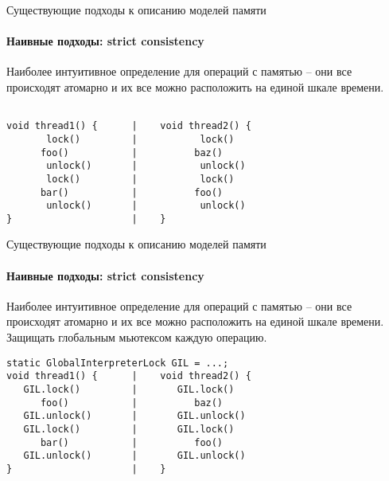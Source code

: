\begin{frame}{Существующие подходы к описанию моделей памяти}
\framesubtitle{Наивные подходы: strict consistency}

Наиболее интуитивное определение для операций с памятью -- они все происходят атомарно и их все можно расположить на единой шкале времени.

\begin{lstlisting}

void thread1() {      |    void thread2() {                                   
       lock()         |           lock()
      foo()           |          baz()                           
       unlock()       |           unlock()
       lock()         |           lock()
      bar()           |          foo()                           
       unlock()       |           unlock()
}                     |    }                    
\end{lstlisting}	

\end{frame}

\begin{frame}{Существующие подходы к описанию моделей памяти}
\framesubtitle{Наивные подходы: strict consistency}

Наиболее интуитивное определение для операций с памятью -- они все происходят атомарно и их все можно расположить на единой шкале времени.
Защищать глобальным мьютексом каждую операцию.

\begin{lstlisting}
static GlobalInterpreterLock GIL = ...;
void thread1() {      |    void thread2() {                                   
   GIL.lock()         |       GIL.lock()
      foo()           |          baz()                           
   GIL.unlock()       |       GIL.unlock()
   GIL.lock()         |       GIL.lock()
      bar()           |          foo()                           
   GIL.unlock()       |       GIL.unlock()
}                     |    }                    
\end{lstlisting}	

\end{frame}

